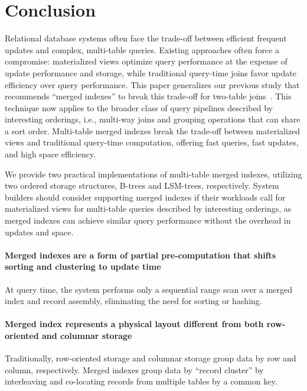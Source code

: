 \documentclass[sigconf, pdfa, nonacm]{acmart}
\begin{document}
\section{Conclusion}\label{sec:conclusion}

Relational database systems often face the trade-off between efficient frequent updates and complex, multi-table queries.
Existing approaches often force a compromise: materialized views optimize query performance at the expense of update performance and storage, while traditional query-time joins favor update efficiency over query performance.
This paper generalizes our previous study that recommends ``merged indexes'' to break this trade-off for two-table joins~\cite{lyu2025indexing}.
This technique now applies to the broader class of query pipelines described by interesting orderings, i.e., multi-way joins and grouping operations that can share a sort order.
Multi-table merged indexes break the trade-off between materialized views and traditional query-time computation, offering fast queries, fast updates, and high space efficiency.

We provide two practical implementations of multi-table merged indexes, utilizing two ordered storage structures, B-trees and LSM-trees, respectively.
System builders should consider supporting merged indexes if their workloads call for materialized views for multi-table queries described by interesting orderings, as merged indexes can achieve similar query performance without the overhead in updates and space.

\paragraph{Merged indexes are a form of partial pre-computation that shifts sorting and clustering to update time}

At query time, the system performs only a sequential range scan over a merged index and record assembly, eliminating the need for sorting or hashing.

\paragraph{Merged index represents a physical layout different from both row-oriented and columnar storage}

Traditionally, row-oriented storage and columnar storage group data by row and column, respectively. 
Merged indexes group data by ``record cluster'' by interleaving and co-locating records from multiple tables by a common key.
\end{document}
